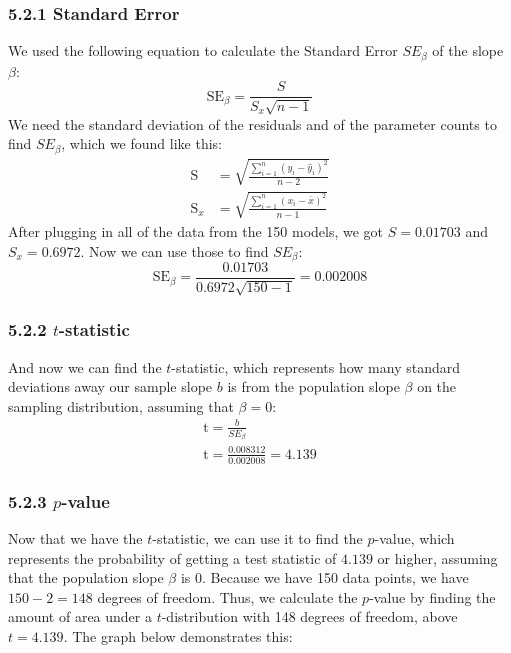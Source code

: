 \documentclass[12pt]{article}
\begin{document}
    \subsubsection*{5.2.1 Standard Error}

    We used the following equation to calculate the Standard Error $SE_\beta$ of the slope $\beta$:
    \[
        \mathrm{SE}_{\beta}
        =
        \frac{
            \displaystyle S
        }{
            \displaystyle S_x \sqrt{n - 1}
        }
    \]
    \noindent We need the standard deviation of the residuals and of the parameter counts to find $SE_\beta$, which we found like this:
    \begin{align*}
        \mathrm{S} &=
        \sqrt{
            \frac{
                \sum_{i=1}^n (y_i - \hat{y}_i)^2
            }{
                n - 2
            }
        } \\[1em]
        \mathrm{S}_x &=
        \sqrt{
            \frac{
                \sum_{i=1}^n (x_i - \bar{x})^2
            }{
                n - 1
            }
        }
    \end{align*}
    \noindent After plugging in all of the data from the 150 models, we got $S = 0.01703$ and $S_x = 0.6972$.
    Now we can use those to find $SE_\beta$:
    \[
        \mathrm{SE}_{\beta}
        =
        \frac{
            \displaystyle 0.01703
        }{
            \displaystyle 0.6972 \sqrt{150 - 1}
        }
        =
        0.002008
    \]

    \subsubsection*{5.2.2 $t$-statistic}
    \noindent And now we can find the $t$-statistic, which represents how many standard deviations away our sample slope $b$ is from the population slope $\beta$ on the sampling distribution, assuming that $\beta=0$:
    \begin{gather*}
        \mathrm{t} = \frac{b}{SE_\beta} \\[1em]
        \mathrm{t} = \frac{0.008312}{0.002008} = 4.139
    \end{gather*}

    \subsubsection*{5.2.3 $p$-value}
    \noindent Now that we have the $t$-statistic, we can use it to find the $p$-value, which represents the probability of getting a test statistic
    of $4.139$ or higher, assuming that the population slope $\beta$ is $0$. Because we have 150 data points, we have $150 - 2 = 148$ degrees of freedom.
    Thus, we calculate the $p$-value by finding the amount of area under a $t$-distribution with 148 degrees of freedom, above $t=4.139$. The graph below demonstrates this:
\end{document}
